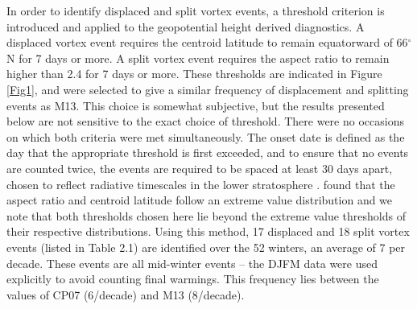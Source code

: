In order to identify displaced and split vortex events, a threshold criterion is
introduced and applied to the geopotential height derived diagnostics. A
displaced vortex event requires the centroid latitude to remain equatorward of
66$^{\circ}$N for 7 days or more. A split vortex event requires the aspect ratio
to remain higher than 2.4 for 7 days or more. These thresholds are indicated in
Figure \ref{Fig1}, and were selected to give a similar frequency of displacement
and splitting events as M13. This choice is somewhat subjective, but the results
presented below are not sensitive to the exact choice of threshold. There were
no occasions on which both criteria were met simultaneously. The onset date is
defined as the day that the appropriate threshold is first exceeded, and to
ensure that no events are counted twice, the events are required to be spaced at
least 30 days apart, chosen to reflect radiative timescales in the lower
stratosphere \citep{Newman1997}.  \citet{Mitchell2011} found that the aspect
ratio and centroid latitude follow an extreme value distribution \citep{Cole}
and we note that both thresholds chosen here lie beyond the extreme value
thresholds of their respective distributions. Using this method, 17 displaced
and 18 split vortex events (listed in Table 2.1) are identified over the 52
winters, an average of 7 per decade. These events are all mid-winter events --
the DJFM data were used explicitly to avoid counting final warmings. This
frequency lies between the values of CP07 (6/decade) and M13 (8/decade).

